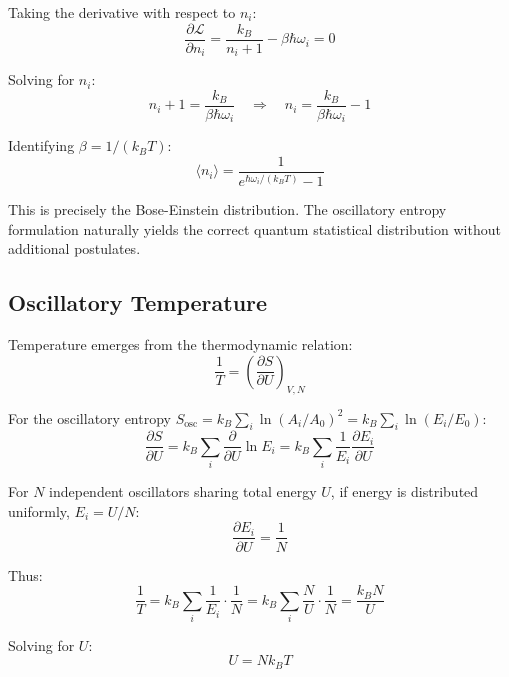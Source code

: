 Taking the derivative with respect to $n_i$:
\begin{equation}
\frac{\partial \mathcal{L}}{\partial n_i} = \frac{k_B}{n_i + 1} - \beta \hbar\omega_i = 0
\end{equation}

Solving for $n_i$:
\begin{equation}
n_i + 1 = \frac{k_B}{\beta \hbar\omega_i} \quad \Rightarrow \quad n_i = \frac{k_B}{\beta \hbar\omega_i} - 1
\end{equation}

Identifying $\beta = 1/(k_B T)$:
\begin{equation}
\boxed{\langle n_i \rangle = \frac{1}{e^{\hbar\omega_i/(k_B T)} - 1}}
\label{eq:bose_einstein}
\end{equation}

This is precisely the Bose-Einstein distribution. The oscillatory entropy formulation naturally yields the correct quantum statistical distribution without additional postulates.

\subsection{Oscillatory Temperature}

Temperature emerges from the thermodynamic relation:
\begin{equation}
\frac{1}{T} = \left(\frac{\partial S}{\partial U}\right)_{V,N}
\end{equation}

For the oscillatory entropy $S_{\text{osc}} = k_B \sum_i \ln(A_i/A_0)^2 = k_B \sum_i \ln(E_i/E_0)$:
\begin{equation}
\frac{\partial S}{\partial U} = k_B \sum_i \frac{\partial}{\partial U}\ln E_i = k_B \sum_i \frac{1}{E_i}\frac{\partial E_i}{\partial U}
\end{equation}

For $N$ independent oscillators sharing total energy $U$, if energy is distributed uniformly, $E_i = U/N$:
\begin{equation}
\frac{\partial E_i}{\partial U} = \frac{1}{N}
\end{equation}

Thus:
\begin{equation}
\frac{1}{T} = k_B \sum_i \frac{1}{E_i} \cdot \frac{1}{N} = k_B \sum_i \frac{N}{U} \cdot \frac{1}{N} = \frac{k_B N}{U}
\end{equation}

Solving for $U$:
\begin{equation}
\boxed{U = N k_B T}
\label{eq:oscillatory_internal_energy}
\end{equation}

